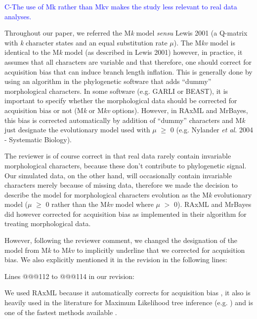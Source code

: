 \documentclass[11pt]{letter}
\begin{document}
\begin{letter}{}
\textcolor{blue}{C-The use of Mk rather than Mkv makes the study less relevant to real data analyses.}

Throughout our paper, we referred the M\textit{k} model \textit{sensu} Lewis 2001 (a Q-matrix with \textit{k} character states and an equal substitution rate $\mu$). The M\textit{kv} model is identical to the M\textit{k} model (as described in Lewis 2001) however, in practice, it assumes that all characters are variable and that therefore, one should correct for acquisition bias that can induce branch length inflation. This is generally done by using an algorithm in the phylogenetic software that adds ``dummy'' morphological characters. In some software (e.g. GARLI or BEAST), it is important to specify whether the morphological data should be corrected for acquisition bias or not (M\textit{k} or M\textit{kv} options). However, in RAxML and MrBayes, this bias is corrected automatically by addition of ``dummy'' characters and M\textit{k} just designate the evolutionary model used with $\mu$ $\geq$ 0 (e.g. Nylander \textit{et al.} 2004 - Systematic Biology). 

The reviewer is of course correct in that real data rarely contain invariable morphological characters, because these don't contribute to phylogenetic signal. Our simulated data, on the other hand, will occasionally contain invariable characters merely because of missing data, therefore we made the decision to describe the model for morphological characters evolution as the M\textit{k} evolutionary model ($\mu$ $\geq$ 0 rather than the M\textit{kv} model where $\mu$ $>$ 0). RAxML and MrBayes did however corrected for acquisition bias as implemented in their algorithm for treating morphological data.

However, following the reviewer comment, we changed the designation of the model from M\textit{k} to M\textit{kv} to implicitly underline that we corrected for acquisition bias. We also explicitly mentioned it in the revision in the following lines:

Lines @@@112 to @@@114 in our revision:

\hfill\begin{minipage}{\dimexpr\textwidth-1cm}
We used RAxML because it automatically corrects for acquisition bias \cite{lewisa2001}, it also is heavily used in the literature for Maximum Likelihood tree inference (e.g. \cite{rouresite-specific2011,Bogdanowicz2012,springermacroevolutionary2012,O'Leary08022013,kellymolecular2014}) and is one of the fastest methods available \cite{Stamatakis01102008}.
\end{minipage}


\end{letter}
\end{document}
